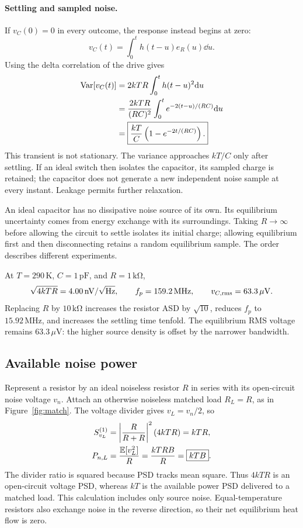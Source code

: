 \paragraph{Settling and sampled noise.}
If $v_C(0)=0$ in every outcome, the response instead begins at zero:
\[
v_C(t)=\int_0^t h(t-u)e_R(u)\dd u.
\]
Using the delta correlation of the drive gives
\begin{align*}
\operatorname{Var}[v_C(t)]
&=2kTR\int_0^t h(t-u)^2\mathrm d u\\
&=\frac{2kTR}{(RC)^2}\int_0^t e^{-2(t-u)/(RC)}\mathrm d u\\
&=\boxed{\frac{kT}{C}\left(1-e^{-2t/(RC)}\right).}
\end{align*}
This transient is not stationary. The variance approaches $kT/C$ only after settling. If an ideal switch then isolates the capacitor, its sampled charge is retained; the capacitor does not generate a new independent noise sample at every instant. Leakage permits further relaxation.

An ideal capacitor has no dissipative noise source of its own. Its equilibrium uncertainty comes from energy exchange with its surroundings. Taking $R\to\infty$ before allowing the circuit to settle isolates its initial charge; allowing equilibrium first and then disconnecting retains a random equilibrium sample. The order describes different experiments.

\begin{example}[title={Changing resistance at fixed capacitance}]
At $T=290\,\mathrm K$, $C=1\,\mathrm{pF}$, and $R=1\,\mathrm{k\Omega}$,
\[
\sqrt{4kTR}=4.00\,\mathrm{nV}/\sqrt{\mathrm{Hz}},\qquad
f_p=159.2\,\mathrm{MHz},\qquad
v_{C,\mathrm{rms}}=63.3\,\mu\mathrm V.
\]
Replacing $R$ by $10\,\mathrm{k\Omega}$ increases the resistor ASD by $\sqrt{10}$, reduces $f_p$ to $15.92\,\mathrm{MHz}$, and increases the settling time tenfold. The equilibrium RMS voltage remains $63.3\,\mu\mathrm V$: the higher source density is offset by the narrower bandwidth.
\end{example}

\subsection{Available noise power}
Represent a resistor by an ideal noiseless resistor $R$ in series with its open-circuit noise voltage $v_n$. Attach an otherwise noiseless matched load $R_L=R$, as in Figure~\ref{fig:match}. The voltage divider gives $v_L=v_n/2$, so
\begin{align}
S_{v_L}^{(1)}&=\left|\frac{R}{R+R}\right|^2(4kTR)=kTR,\\
P_{n,L}&=\frac{\mathbb E[v_L^2]}{R}
=\frac{kTRB}{R}=\boxed{kTB}.\label{eq:ktb}
\end{align}
The divider ratio is squared because PSD tracks mean square. Thus $4kTR$ is an open-circuit voltage PSD, whereas $kT$ is the available power PSD delivered to a matched load. This calculation includes only source noise. Equal-temperature resistors also exchange noise in the reverse direction, so their net equilibrium heat flow is zero.
\MatchedResistorFigure

